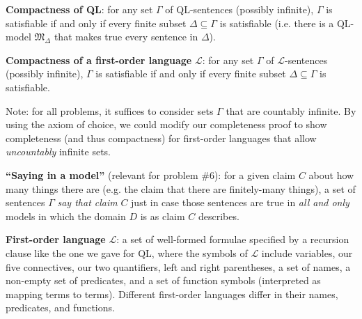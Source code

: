 \documentclass[12pt]{article}
\newcommand*{\script}[1]{\ensuremath{\mathcal{#1}}}
\begin{document}
\begin{enumerate}
\textbf{Compactness of QL}: for any set $\Gamma$ of QL-sentences (possibly infinite), $\Gamma$ is satisfiable if and only if every finite subset $\Delta \subseteq \Gamma$ is satisfiable (i.e. there is a QL-model $\mathfrak{M}_{\Delta}$ that makes true every sentence in $\Delta$). 

\textbf{Compactness of a first-order language} $\script{L}$: for any set $\Gamma$ of $\script{L}$-sentences (possibly infinite), $\Gamma$ is satisfiable if and only if every finite subset $\Delta \subseteq \Gamma$ is satisfiable. 

Note: for all problems, it suffices to consider sets $\Gamma$ that are countably infinite. By using the axiom of choice, we could modify our completeness proof to show completeness (and thus compactness) for first-order languages that allow \textit{uncountably} infinite sets. 

\textbf{``Saying in a model''} (relevant for problem \#6): for a given claim $C$ about how many things there are (e.g. the claim that there are finitely-many things), a set of sentences $\Gamma$ \textit{say that claim} $C$ just in case those sentences are true in \textit{all and only} models in which the domain $D$ is as claim $C$ describes. 

\textbf{First-order language} $\script{L}$: a set of well-formed formulae specified by a recursion clause like the one we gave for QL, where the symbols of $\script{L}$ include variables, our five connectives, our two quantifiers, left and right parentheses, a set of names, a non-empty set of predicates, and a set of function symbols (interpreted as mapping terms to terms). Different first-order languages differ in their names, predicates, and functions. 

















 
\iffalse

d

\fi 






























\end{enumerate}
\end{document}
